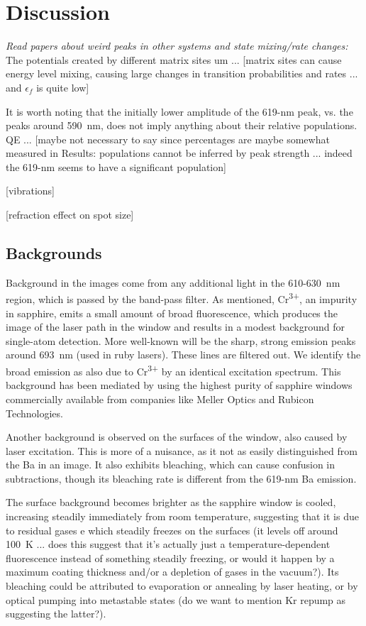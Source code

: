 \documentclass[aps,pra,reprint,superscriptaddress]{revtex4-1}
\begin{document}
\section{Discussion}

{\color{gray}\emph{Read papers about weird peaks in other systems and state mixing/rate changes:}}  The potentials created by different matrix sites um ... [matrix sites can cause energy level mixing, causing large changes in transition probabilities and rates ... and $\epsilon_f$ is quite low]

It is worth noting that the initially lower amplitude of the 619-nm peak, vs. the peaks around 590~nm, does not imply anything about their relative populations.  QE ... [maybe not necessary to say since percentages are maybe somewhat measured in Results:  populations cannot be inferred by peak strength ... indeed the 619-nm seems to have a significant population]

[vibrations]

[refraction effect on spot size]

\subsection{Backgrounds}
\label{sec:backgrounds}

Background in the images come from any additional light in the 610-630~nm region, which is passed by the band-pass filter.  As mentioned, Cr\textsuperscript{3+}, an impurity in sapphire, emits a small amount of broad fluorescence, which produces the image of the laser path in the window and results in a modest background for single-atom detection.  More well-known will be the sharp, strong emission peaks around 693~nm (used in ruby lasers).  These lines are filtered out.  We identify the broad emission as also due to Cr\textsuperscript{3+} by an identical excitation spectrum.  This background has been mediated by using the highest purity of sapphire windows commercially available from companies like Meller Optics and Rubicon Technologies.

Another background is observed on the surfaces of the window, also caused by laser excitation.  This is more of a nuisance, as it not as easily distinguished from the Ba in an image.  It also exhibits bleaching, which can cause confusion in subtractions, though its bleaching rate is different from the 619-nm Ba emission.  

The surface background becomes brighter as the sapphire window is cooled, increasing steadily immediately from room temperature, suggesting that it is due to residual gases e which steadily freezes on the surfaces {\color{red}(it levels off around 100~K ... does this suggest that it's actually just a temperature-dependent fluorescence instead of something steadily freezing, or would it happen by a maximum coating thickness and/or a depletion of gases in the vacuum?)}.  Its bleaching could be attributed to evaporation or annealing by laser heating, or by optical pumping into metastable states {\color{red}(do we want to mention Kr repump as suggesting the latter?)}.
\end{document}
